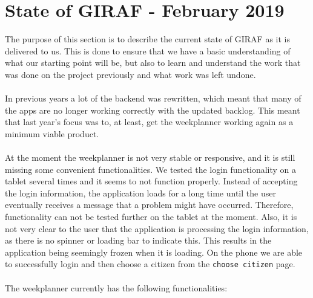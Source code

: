 \section{State of GIRAF - February 2019}
The purpose of this section is to describe the current state of GIRAF as it is delivered to us.
This is done to ensure that we have a basic understanding of what our starting point will be, but also to learn and understand the work that was done on the project previously and what work was left undone.
\\\\
In previous years a lot of the backend was rewritten, which meant that many of the apps are no longer working correctly with the updated backlog.
This meant that last year's focus was to, at least, get the weekplanner working again as a minimum viable product.
\\\\
At the moment the weekplanner is not very stable or responsive, and it is still missing some convenient functionalities.
We tested the login functionality on a tablet several times and it seems to not function properly.
Instead of accepting the login information, the application loads for a long time until the user eventually receives a message that a problem might have occurred.
Therefore, functionality can not be tested further on the tablet at the moment.
Also, it is not very clear to the user that the application is processing the login information, as there is no spinner or loading bar to indicate this.
This results in the application being seemingly frozen when it is loading.
On the phone we are able to successfully login and then choose a citizen from the \texttt{choose citizen} page.
\\\\
The weekplanner currently has the following functionalities:
